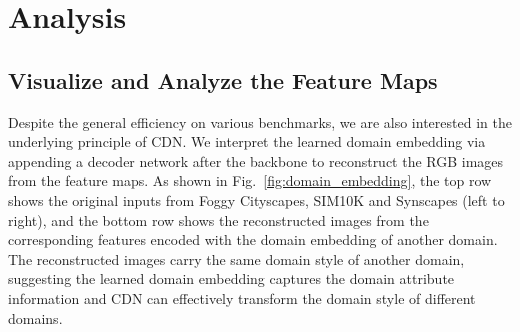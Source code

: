 \documentclass[runningheads]{llncs}
\begin{document}
\section{Analysis}

\subsection{Visualize and Analyze the Feature Maps}
Despite the general efficiency on various benchmarks, we are also interested in the underlying principle of CDN.
We interpret the learned domain embedding via appending a decoder network after the backbone to reconstruct the RGB images from the feature maps.
As shown in Fig.~\ref{fig:domain_embedding}, the top row shows the original inputs from Foggy Cityscapes, SIM10K  and Synscapes (left to right), and the bottom row shows the  reconstructed images from the corresponding features encoded with the domain embedding of another domain.
The reconstructed images carry the same domain style of another domain, suggesting the learned domain embedding captures the domain attribute information
and CDN can effectively transform the domain style of different domains.

\begin{figure*}[]
\centering
{}  \hspace{0.15pt}
   \hspace{0.15pt}
  \hspace{0.15pt}
   \hspace{0.15pt}
  \hspace{0.15pt}
\\
  \hspace{0.15pt}
   \hspace{0.15pt}
  \hspace{0.15pt}
   \hspace{0.15pt}
  \hspace{0.15pt}
\\

\caption{Top row: Original inputs from Foggy Cityscapes, SIM10K  and Synscapes (left to right);
Bottom row: Reconstructed images from features encoded with the learned domain embedding of another domain.
}
\label{fig:domain_embedding}
\end{figure*}
\end{document}
